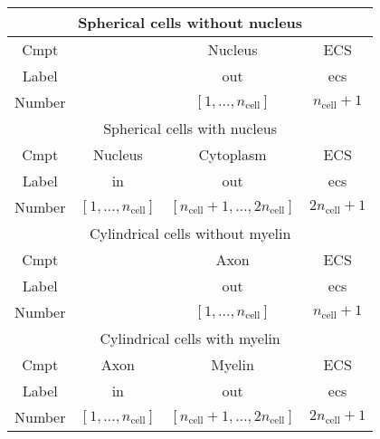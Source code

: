 \begin{tabular}{|c|c|c|c|}

	\multicolumn{4}{c}{Spherical cells without nucleus}                                                          \\ \hline
	Cmpt   &                             & Nucleus                                       & ECS                   \\ \hline
	Label  &                             & out                                           & ecs                   \\ \hline
	Number &                             & $[1, \dots, n_\text{cell}]$                   & $n_\text{cell} + 1$   \\ \hline

	\multicolumn{4}{c}{Spherical cells with nucleus}                                                             \\ \hline
	Cmpt   & Nucleus                     & Cytoplasm                                     & ECS                   \\ \hline
	Label  & in                          & out                                           & ecs                   \\ \hline
	Number & $[1, \dots, n_\text{cell}]$ & $[n_\text{cell} + 1, \dots, 2 n_\text{cell}]$ & $2 n_\text{cell} + 1$ \\ \hline

	\multicolumn{4}{c}{Cylindrical cells without myelin}                                                         \\ \hline
	Cmpt   &                             & Axon                                          & ECS                   \\ \hline
	Label  &                             & out                                           & ecs                   \\ \hline
	Number &                             & $[1, \dots, n_\text{cell}]$                   & $n_\text{cell} + 1$   \\ \hline

	\multicolumn{4}{c}{Cylindrical cells with myelin}                                                            \\ \hline
	Cmpt   & Axon                        & Myelin                                        & ECS                   \\ \hline
	Label  & in                          & out                                           & ecs                   \\ \hline
	Number & $[1, \dots, n_\text{cell}]$ & $[n_\text{cell} + 1, \dots, 2 n_\text{cell}]$ & $2 n_\text{cell}+1$   \\ \hline


\end{tabular}
